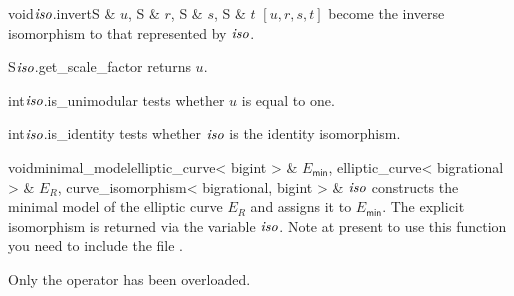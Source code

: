 \begin{cfcode}{void}{$\mathit{iso}$.invert}{S & $u$, S & $r$, S & $s$, S & $t$}
  $[u,r,s,t]$ become the inverse isomorphism to that represented by $\mathit{iso}$.
\end{cfcode}

\begin{cfcode}{S}{$\mathit{iso}$.get_scale_factor}{}
  returns $u$.
\end{cfcode}

\begin{cfcode}{int}{$\mathit{iso}$.is_unimodular}{}
  tests whether $u$ is equal to one.
\end{cfcode}

\begin{cfcode}{int}{$\mathit{iso}$.is_identity}{}
  tests whether $\mathit{iso}$ is the identity isomorphism.
\end{cfcode}

\begin{fcode}{void}{minimal_model}{elliptic_curve< bigint > & $E_{\textsf{min}}$,
    elliptic_curve< bigrational > & $E_R$, curve_isomorphism< bigrational, bigint > & $\mathit{iso}$}%
  constructs the minimal model of the elliptic curve $E_R$ and assigns it to $E_{\textsf{min}}$.
  The explicit isomorphism is returned via the variable $\mathit{iso}$.  Note at present to use this
  function you need to include the file .
\end{fcode}



\IO

Only the  operator \code{<<} has been overloaded.



\EXAMPLES

